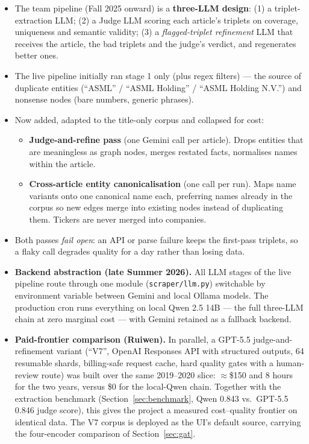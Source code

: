 \documentclass[11pt]{article}
\begin{document}
\begin{itemize}
  \item The team pipeline (Fall 2025 onward) is a \textbf{three-LLM design}: (1) a triplet-extraction LLM; (2) a Judge LLM scoring each article's triplets on coverage, uniqueness and semantic validity; (3) a \emph{flagged-triplet refinement} LLM that receives the article, the bad triplets and the judge's verdict, and regenerates better ones.
  \item The live pipeline initially ran stage 1 only (plus regex filters) --- the source of duplicate entities (``ASML'' / ``ASML Holding'' / ``ASML Holding N.V.'') and nonsense nodes (bare numbers, generic phrases).
  \item Now added, adapted to the title-only corpus and collapsed for cost:
  \begin{itemize}
    \item \textbf{Judge-and-refine pass} (one Gemini call per article). Drops entities that are meaningless as graph nodes, merges restated facts, normalises names within the article.
    \item \textbf{Cross-article entity canonicalisation} (one call per run). Maps name variants onto one canonical name each, preferring names already in the corpus so new edges merge into existing nodes instead of duplicating them. Tickers are never merged into companies.
  \end{itemize}
  \item Both passes \emph{fail open}: an API or parse failure keeps the first-pass triplets, so a flaky call degrades quality for a day rather than losing data.
  \item \textbf{Backend abstraction (late Summer 2026).} All LLM stages of the live pipeline route through one module (\texttt{scraper/llm.py}) switchable by environment variable between Gemini and local Ollama models. The production cron runs everything on local Qwen 2.5 14B --- the full three-LLM chain at zero marginal cost --- with Gemini retained as a fallback backend.
  \item \textbf{Paid-frontier comparison (Ruiwen).} In parallel, a GPT-5.5 judge-and-refinement variant (``V7'', OpenAI Responses API with structured outputs, 64 resumable shards, billing-safe request cache, hard quality gates with a human-review route) was built over the same 2019--2020 slice: \(\approx\)\$150 and 8 hours for the two years, versus \$0 for the local-Qwen chain. Together with the extraction benchmark (Section~\ref{sec:benchmark}, Qwen 0.843 vs.\ GPT-5.5 0.846 judge score), this gives the project a measured cost--quality frontier on identical data. The V7 corpus is deployed as the UI's default source, carrying the four-encoder comparison of Section~\ref{sec:gat}.
\end{itemize}
\end{document}
